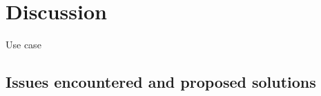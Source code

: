 \section{Discussion}
\label{Discussion}

Use case \\

\subsection{Issues encountered and proposed solutions}
\label{sec:issues}